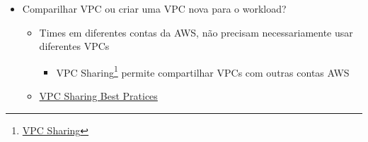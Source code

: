 \begin{frame}[allowframebreaks]
\begin{itemize}
			\begin{itemize}
				\item Pelo menos 1 subnet por VPC
				\item Aplicação em várias AZs = pelo menos uma subnet por AZ
					\begin{itemize}
						\item OBS: Quando uma subnet é colocada em uma AZ não é possível mudar
					\end{itemize}
			\end{itemize}
		\item Comparilhar VPC ou criar uma VPC nova para o workload?
			\begin{itemize}
				\item Times em diferentes contas da AWS, não precisam necessariamente usar diferentes VPCs
					\begin{itemize}
						\item VPC Sharing\footnote{\href{https://aws.amazon.com/blogs/networking-and-content-delivery/vpc-sharing-a-new-approach-to-multiple-accounts-and-vpc-management/}{VPC Sharing}} permite compartilhar VPCs com outras contas AWS
					\end{itemize}
				\item \href{https://aws.amazon.com/blogs/networking-and-content-delivery/vpc-sharing-key-considerations-and-best-practices/}{VPC Sharing Best Pratices}
			\end{itemize}
	\end{itemize}
\end{frame}

